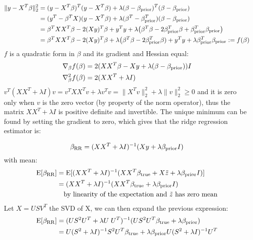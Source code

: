\documentclass[12pt,twoside]{article}
\begin{document}
\begin{enumerate}
\begin{enumerate}
\medskip
 
 \begin{align*}
 	\| y - X^T \beta \|_2^2		&=	(y - X^T \beta)^T (y - X^T \beta) + \lambda (\beta - \beta_{\operatorname{prior}})^T (\beta - \beta_{\operatorname{prior}}) \\
							&=	(y^T - \beta^T X)  (y - X^T \beta) + \lambda (\beta^T - \beta_{\operatorname{prior}}^T) (\beta - \beta_{\operatorname{prior}}) \\
							&=	\beta^T X X^T \beta -2 (X y)^T \beta + y^T y + \lambda \big( \beta^T \beta -2  \beta_{\operatorname{prior}}^T \beta +  \beta_{\operatorname{prior}}^T \beta_{\operatorname{prior}} \big) \\
							&=	\beta^T X X^T \beta -2 (X y)^T \beta + \lambda \big( \beta^T \beta -2  \beta_{\operatorname{prior}}^T \beta) +  y^T y +  \lambda  \beta_{\operatorname{prior}}^T \beta_{\operatorname{prior}} := f(\beta)
 \end{align*}    
 $f$ is a quadratic form in $\beta$ and its gradient and Hessian equal:
 \begin{align*}
 	\nabla_{\beta} f(\beta)		&=	2 (X X^T \beta - X y +  \lambda (\beta - \beta_{\operatorname{prior}})) I \\
	\nabla_{\beta}^2 f(\beta)		&=	2 (X X^T  +  \lambda I) 
 \end{align*}    
  $v^T (X X^T  +  \lambda I) v  = v^T X X^T v + \lambda v^T v = \|X^T v \|_2^2 + \lambda \| v \|_2^2 \ge 0$ and it is zero only when $v$ is the zero vector (by property of the norm operator), thus the matrix $X X^T  +  \lambda I$ is positive definite
  and invertible. The unique minimum can be found by setting the gradient to zero, which gives that the ridge regression estimator is:
  
  $$\beta_{\operatorname{RR}}  =   (X X^T  +  \lambda I)^{-1} (X y + \lambda \beta_{\operatorname{prior}} I )$$
  with mean:
\begin{align*}
  	\mathrm{E}[\beta_{\operatorname{RR}} ]		&= 		\mathrm{E}[ (X X^T  +  \lambda I)^{-1} (X X^T \beta_{\operatorname{true}} + X \tilde{ z } +  \lambda \beta_{\operatorname{prior}} I )] \\
						&=		 (X X^T  +  \lambda I)^{-1} (X X^T \beta_{\operatorname{true}}  + \lambda \beta_{\operatorname{prior}} I) \\
						&	\text{ ~ by linearity of the expectation and } \tilde{ z } \text{ has zero mean}
\end{align*} 
Let $X=U S V^T$ the SVD of X, we can then expand the previous expression:
\begin{align*}
	\mathrm{E}[\beta_{\operatorname{RR}} ]		&=	(U S^2 U^T + \lambda U \; U^T)^{-1}	(U S^2 U^T \beta_{\operatorname{true}}  + \lambda \beta_{\operatorname{prior}}) \\
						&=	U (S^2 + \lambda I)^{-1} S^2 U^T  \beta_{\operatorname{true}}  +  \lambda \beta_{\operatorname{prior}} U (S^2 + \lambda I)^{-1} U^T
\end{align*} 


\end{enumerate}
\end{enumerate}
\end{document}
